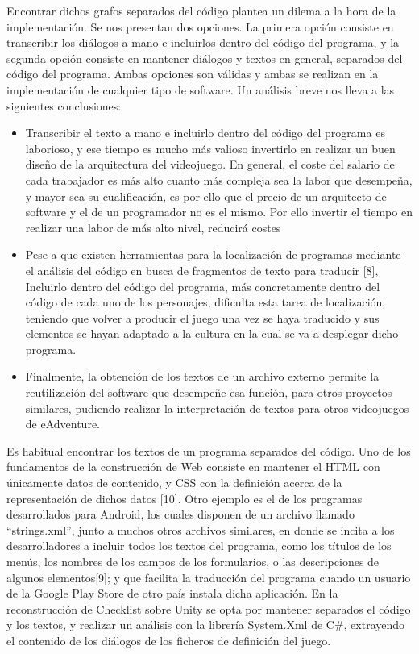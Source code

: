 Encontrar dichos grafos separados del código plantea un dilema a la hora de la implementación. Se nos presentan dos opciones. La primera opción consiste en transcribir los diálogos a mano e incluirlos dentro del código del programa, y la segunda opción consiste en mantener diálogos y textos en general, separados del código del programa. Ambas opciones son válidas y ambas se realizan en la implementación de cualquier tipo de software. Un análisis breve nos lleva a las siguientes conclusiones: 

\begin{itemize}
	\item 
	Transcribir el texto a mano e incluirlo dentro del código del programa es laborioso, y ese tiempo es mucho más valioso invertirlo en realizar un buen diseño de la arquitectura del videojuego. En general, el coste del salario de cada trabajador es más alto cuanto más compleja sea la labor que desempeña, y mayor sea su cualificación, es por ello que el precio de un arquitecto de software y el de un programador no es el mismo. Por ello invertir el tiempo en realizar una labor de más alto nivel, reducirá costes
	\item 
	Pese a que existen herramientas para la localización de programas mediante el análisis del código en busca de fragmentos de texto para traducir [8], Incluirlo dentro del código del programa, más concretamente dentro del código de cada uno de los personajes, dificulta esta tarea de localización, teniendo que volver a producir el juego una vez se haya traducido y sus elementos se hayan adaptado a la cultura en la cual se va a desplegar dicho programa. 
	\item
	Finalmente, la obtención de los textos de un archivo externo permite la reutilización del software que desempeñe esa función, para otros proyectos similares, pudiendo realizar la interpretación de textos para otros videojuegos de eAdventure. 
\end{itemize}

Es habitual encontrar los textos de un programa separados del código. Uno de los fundamentos de la construcción de Web consiste en mantener el HTML con únicamente datos de contenido, y CSS con la definición acerca de la representación de dichos datos [10]. Otro ejemplo es el de los programas desarrollados para Android, los cuales disponen de un archivo llamado “strings.xml”, junto a muchos otros archivos similares, en donde se incita a los desarrolladores a incluir todos los textos del programa, como los títulos de los menús, los nombres de los campos de los formularios, o las descripciones de algunos elementos[9]; y que facilita la traducción del programa cuando un usuario de la Google Play Store de otro país instala dicha aplicación. En la reconstrucción de Checklist sobre Unity se opta por mantener separados el código y los textos, y realizar un análisis con la librería System.Xml de C#, extrayendo el contenido de los diálogos de los ficheros de definición del juego. 

